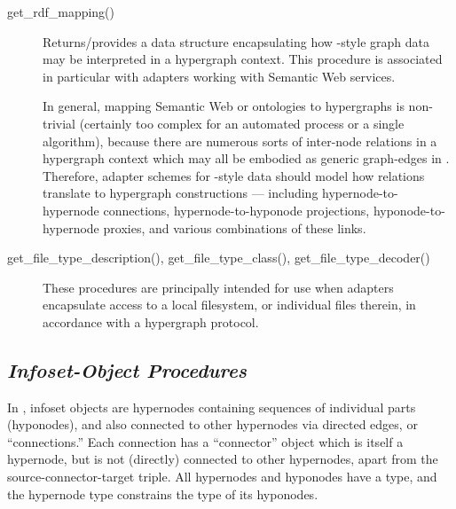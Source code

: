 \documentclass[12pt,letterpaper]{article}
\newcommand{\procitem}[1]{{#1}}
\newcommand{\HGDM}{\resizebox{!}{7.5pt}{\ATexttclr{HGDM}}}
\newcommand{\ATexttclr}[1]{\textcolor{tcolor}{\textbf{#1}}}
\newcommand{\RDF}{\resizebox{!}{8pt}{\AcronymText{RDF}}}
\newcommand{\textscc}[1]{{\color{orr!35!black}{{%
{\textsc{\textbf{#1}}}}}}}
\newcommand{\AcronymText}[1]{{\textscc{#1}}}
\newcommand{\p}[1]{

\vspace{.7em}#1}
\newcommand{\q}[1]{{\fontfamily{qcr}\selectfont ``}#1{\fontfamily{qcr}\selectfont ''}}
\begin{document}
{{\begin{description}
\item[\procitem{get\_rdf\_mapping()}]  Returns/provides 
a data structure encapsulating how \RDF{}-style 
graph data may be interpreted in a hypergraph context.  
This procedure is associated in particular 
with adapters working with Semantic Web services.

\descindent{}  In general, mapping 
Semantic Web or \RDF{} ontologies to hypergraphs 
is non-trivial (certainly too complex for an 
automated process or a single algorithm), 
because there are numerous sorts 
of inter-node relations in a hypergraph 
context which may all be embodied as generic 
graph-edges in \RDF{}.  Therefore, adapter schemes 
for \RDF{}-style data should model how \RDF{} 
relations translate to hypergraph constructions --- including 
hypernode-to-hypernode connections, hypernode-to-hyponode 
projections, hyponode-to-hypernode proxies, and various 
combinations of these links.  

\item[\procitem{get\_file\_type\_description()},  
\procitem{get\_file\_type\_class()}, 
\procitem{get\_file\_type\_decoder()}]  These procedures 
are principally intended for use when adapters 
encapsulate access to a local filesystem, or individual files 
therein, in accordance with a hypergraph protocol.  


\end{description}


}

\subsection[Infoset-Object Procedures]{\textit{Infoset-Object Procedures}}

\p{In \HGDM{}, infoset objects are hypernodes 
containing sequences of individual parts 
(hyponodes), and also connected to other hypernodes 
via directed edges, or \q{connections.}  Each 
connection has a \q{connector} object which is itself 
a hypernode, but is not (directly) connected to 
other hypernodes, apart from the source-connector-target 
triple.  All hypernodes and hyponodes have a type, 
and the hypernode type constrains the type of its 
hyponodes.}

}
\end{document}

